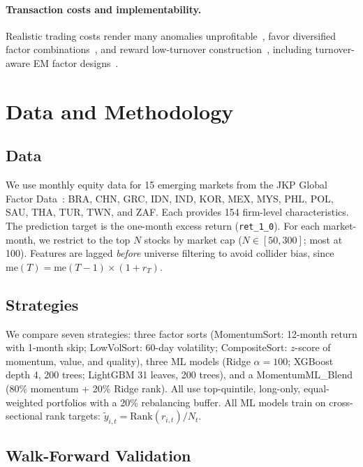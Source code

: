 \documentclass[sigconf,review,anonymous,balance=false]{acmart}
\begin{document}
\paragraph{Transaction costs and implementability.}
Realistic trading costs render many anomalies
unprofitable~\cite{novymarx2016taxonomy}, favor diversified factor
combinations~\cite{demiguel2020transaction}, and reward low-turnover
construction~\cite{frazzini2018trading}, including turnover-aware EM
factor designs~\cite{stankov2024cost}.


\section{Data and Methodology}

\subsection{Data}

We use monthly equity data for 15 emerging markets from the JKP Global
Factor Data~\cite{JensenKellyPedersen2023}: BRA, CHN, GRC, IDN, IND,
KOR, MEX, MYS, PHL, POL, SAU, THA, TUR, TWN, and ZAF. Each provides
154 firm-level characteristics. The prediction target is the one-month
excess return (\texttt{ret\_1\_0}). For each market-month, we restrict
to the top $N$ stocks by market cap ($N \in [50, 300]$; most at 100).
Features are lagged \emph{before} universe filtering to avoid collider
bias, since $\text{me}(T) = \text{me}(T{-}1) \times (1{+}r_T)$.

\subsection{Strategies}

We compare seven strategies: three factor sorts (MomentumSort: 12-month
return with 1-month skip; LowVolSort: 60-day volatility; CompositeSort:
$z$-score of momentum, value, and quality), three ML models (Ridge
$\alpha{=}100$; XGBoost depth 4, 200 trees; LightGBM 31 leaves, 200
trees), and a MomentumML\_Blend (80\% momentum + 20\% Ridge rank). All
use top-quintile, long-only, equal-weighted portfolios with a 20\%
rebalancing buffer. All ML models train on cross-sectional rank targets:
$\tilde{y}_{i,t} = \text{Rank}(r_{i,t}) / N_t$.

\subsection{Walk-Forward Validation}
\end{document}

